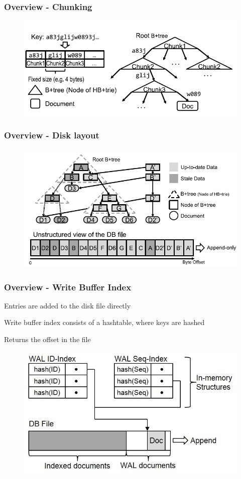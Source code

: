 \documentclass[aspectratio=169]{beamer}
\begin{document}
\begin{frame}[t]
	\frametitle{Overview - Chunking}
	\begin{figure}[h!]
		\includegraphics[scale=0.7]{logical_layout}
	\end{figure}
	\centering	
\end{frame}
\begin{frame}[t]
	\frametitle{Overview - Disk layout}
	\begin{figure}[h!]
		\includegraphics[scale=0.5]{disk_layout}
	\end{figure}
	\centering	
\end{frame}
\begin{frame}[t]
	\frametitle{Overview - Write Buffer Index}
	Entries are added to the disk file directly
	
	Write buffer index consists of a hashtable, where keys are hashed
	
	Returns the offset in the file
	\begin{figure}[h!]
		\includegraphics[scale=0.7]{writebufferindex}
	\end{figure}
	\centering	
\end{frame}
\end{document}
